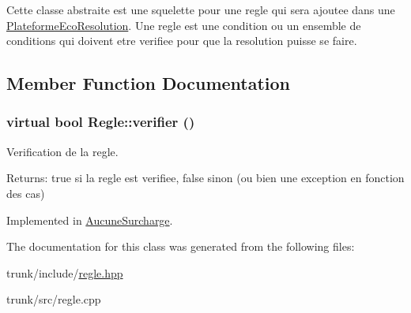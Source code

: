 Cette classe abstraite est une squelette pour une regle qui sera ajoutee dans une \hyperlink{classPlateformeEcoResolution}{PlateformeEcoResolution}. Une regle est une condition ou un ensemble de conditions qui doivent etre verifiee pour que la resolution puisse se faire. 

\subsection{Member Function Documentation}
\hypertarget{classRegle_4b3de9a64ec0e948e9177026afcc073d}{
\subsubsection[{verifier}]{\setlength{\rightskip}{0pt plus 5cm}virtual bool Regle::verifier ()}}
\label{classRegle_4b3de9a64ec0e948e9177026afcc073d}


Verification de la regle. 

\begin{Desc}
\item[Returns:]true si la regle est verifiee, false sinon (ou bien une exception en fonction des cas) \end{Desc}


Implemented in \hyperlink{classAucuneSurcharge_d96084db10b49f9c48f6cb005248f7c4}{AucuneSurcharge}.

The documentation for this class was generated from the following files:\begin{CompactItemize}
\item 
trunk/include/\hyperlink{regle_8hpp}{regle.hpp}\item 
trunk/src/regle.cpp\end{CompactItemize}
